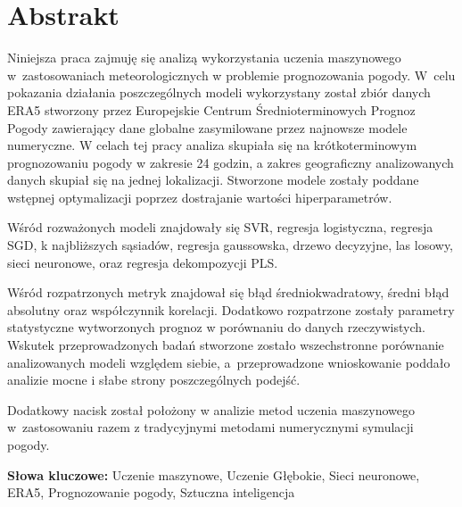 \documentclass{article}
\begin{document}

\begin{titlepage}
    
\end{titlepage}

\tableofcontents
\pagebreak

\section*{Abstrakt}

Niniejsza praca zajmuję się analizą wykorzystania uczenia maszynowego w~zastosowaniach meteorologicznych
w problemie prognozowania pogody. W~celu pokazania działania poszczególnych modeli wykorzystany został
zbiór danych ERA5 stworzony przez Europejskie Centrum Średnioterminowych Prognoz Pogody zawierający
dane globalne zasymilowane przez najnowsze modele numeryczne. W celach tej pracy analiza skupiała 
się na krótkoterminowym prognozowaniu pogody w zakresie 24 godzin,
a zakres geograficzny analizowanych danych skupiał się na jednej lokalizacji. 
Stworzone modele zostały poddane wstępnej optymalizacji poprzez dostrajanie wartości hiperparametrów.

Wśród rozważonych modeli znajdowały się SVR, regresja logistyczna, regresja SGD,
k najbliższych sąsiadów, regresja gaussowska, drzewo decyzyjne, las losowy, sieci neuronowe,
oraz regresja dekompozycji PLS.

Wśród rozpatrzonych metryk znajdował się błąd średniokwadratowy, średni błąd absolutny oraz współczynnik
korelacji. Dodatkowo rozpatrzone zostały parametry statystyczne wytworzonych prognoz w porównaniu
do danych rzeczywistych. Wskutek przeprowadzonych badań stworzone zostało wszechstronne porównanie
analizowanych modeli względem siebie, a~przeprowadzone wnioskowanie poddało analizie 
mocne i słabe strony poszczególnych podejść.

Dodatkowy nacisk został położony w analizie metod uczenia maszynowego w~zastosowaniu razem z 
tradycyjnymi metodami numerycznymi symulacji pogody. 

\bigskip

\noindent
{\bf Słowa kluczowe:} Uczenie maszynowe, Uczenie Głębokie, Sieci neuronowe,
ERA5, Prognozowanie pogody, Sztuczna inteligencja
\pagebreak



% 



% 

\end{document}
